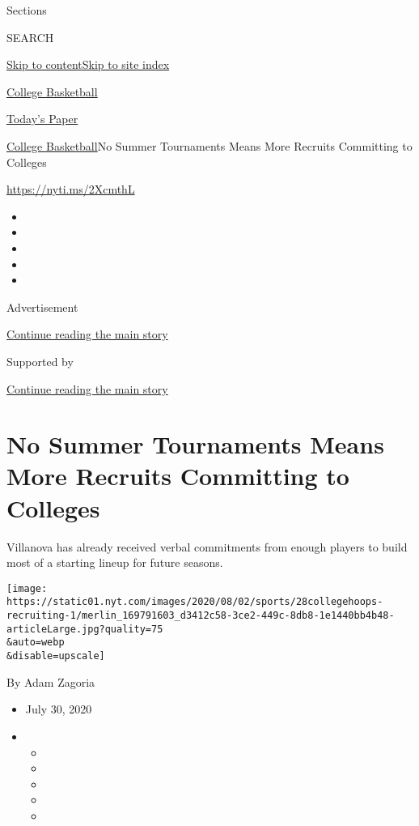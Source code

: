 Sections

SEARCH

\protect\hyperlink{site-content}{Skip to
content}\protect\hyperlink{site-index}{Skip to site index}

\href{https://www.nytimes.com/section/sports/ncaabasketball}{College
Basketball}

\href{https://myaccount.nytimes.com/auth/login?response_type=cookie\&client_id=vi}{}

\href{https://www.nytimes.com/section/todayspaper}{Today's Paper}

\href{/section/sports/ncaabasketball}{College Basketball}\textbar{}No
Summer Tournaments Means More Recruits Committing to Colleges

\url{https://nyti.ms/2XcmthL}

\begin{itemize}
\item
\item
\item
\item
\item
\end{itemize}

Advertisement

\protect\hyperlink{after-top}{Continue reading the main story}

Supported by

\protect\hyperlink{after-sponsor}{Continue reading the main story}

\hypertarget{no-summer-tournaments-means-more-recruits-committing-to-colleges}{%
\section{No Summer Tournaments Means More Recruits Committing to
Colleges}\label{no-summer-tournaments-means-more-recruits-committing-to-colleges}}

Villanova has already received verbal commitments from enough players to
build most of a starting lineup for future seasons.

\texttt{[image: https://static01.nyt.com/images/2020/08/02/sports/28collegehoops-recruiting-1/merlin\_169791603\_d3412c58-3ce2-449c-8db8-1e1440bb4b48-articleLarge.jpg?quality=75\\\&auto=webp\\\&disable=upscale]}

By Adam Zagoria

\begin{itemize}
\item
  July 30, 2020
\item
  \begin{itemize}
  \item
  \item
  \item
  \item
  \item
  \end{itemize}
\end{itemize}

